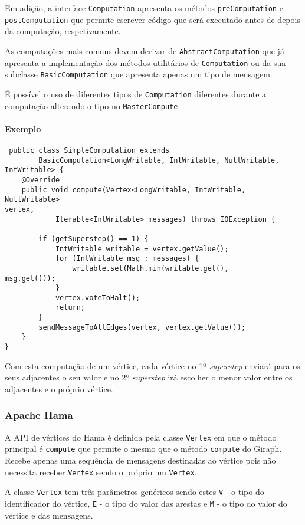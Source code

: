 Em adição, a interface \texttt{Computation} apresenta os métodos \texttt{preComputation} e \texttt{postComputation} que permite escrever código que será executado antes de depois da computação, respetivamente.

As computações mais comuns devem derivar de \texttt{AbstractComputation} que já apresenta a implementação dos métodos utilitários de \texttt{Computation} ou da sua subclasse \texttt{BasicComputation} que apresenta apenas um tipo de mensagem.

É possível o uso de diferentes tipos de \texttt{Computation} diferentes durante a computação alterando o tipo no \texttt{MasterCompute}.

\paragraph{Exemplo}
\begin{verbatim}
 public class SimpleComputation extends
		BasicComputation<LongWritable, IntWritable, NullWritable, 
IntWritable> {
	@Override
	public void compute(Vertex<LongWritable, IntWritable, NullWritable> 
vertex,
			Iterable<IntWritable> messages) throws IOException {

		if (getSuperstep() == 1) {
			IntWritable writable = vertex.getValue();
			for (IntWritable msg : messages) {
				writable.set(Math.min(writable.get(), 
msg.get()));
			}
			vertex.voteToHalt();
			return;
		}
		sendMessageToAllEdges(vertex, vertex.getValue());
	}
}
\end{verbatim}

Com esta computação de um vértice, cada vértice no 1º \textit{superstep} 
enviará para os seus adjacentes o seu valor e no 2º \textit{superstep} irá 
escolher o menor valor entre os adjacentes e o próprio vértice.

\subsubsection*{Apache Hama}
A API de vértices do Hama é definida pela classe \texttt{Vertex} em que o método principal é \texttt{compute} que permite o mesmo que o método \texttt{compute} do Giraph. Recebe apenas uma sequência de mensagens destinadas ao vértice pois não necessita receber \texttt{Vertex} sendo o próprio um \texttt{Vertex}.

A classe \texttt{Vertex} tem três parâmetros genéricos sendo estes \texttt{V} - o tipo do identificador do vértice, \texttt{E} - o tipo do valor das arestas e \texttt{M} - o tipo do valor do vértice e das mensagens.


